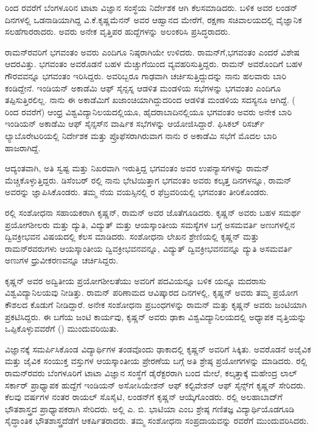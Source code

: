  ರಿಂದ  ರವರೆಗೆ ಬೆಂಗಳೂರಿನ ಟಾಟಾ ವಿಜ್ಞಾನ ಸಂಸ್ಥೆಯ ನಿರ್ದೇಶಕ ಆಗಿ ಕೆಲಸಮಾಡಿದರು. ಬಳಿಕ ಅವರ ಲಂಡನ್ ದಿನಗಳಲ್ಲಿ ಒಡನಾಡಿಯಾಗಿದ್ದ ವಿ.ಕೆ.ಕೃಷ್ಣಮೆನನ್ ಅವರ ಆಹ್ವಾನದ ಮೇರೆಗೆ, ರಕ್ಷಣಾ ಸಚಿವಾಲಯದಲ್ಲಿ ವೈಜ್ಞಾನಿಕ ಸಲಹೆಗಾರರಾದರು. ಅವರು ಅನೇಕ ವೃತ್ತಿಪರ ಹುದ್ದೆಗಳನ್ನು ಅಲಂಕರಿಸಿ ಪ್ರಸಿದ್ಧರಾದರು.

ರಾಮನ್‍ರವರಿಗೆ ಭಗವಂತಂ ಅವರು ಎಂದಿಗೂ ನಿಷ್ಠರಾಗಿಯೇ ಉಳಿದರು. ರಾಮನ್‍ಗೆ,\break ಭಗವಂತಂ ಎಂದರೆ ವಿಶೇಷ ಆದರವಿತ್ತು. ಭಗವಂತಂ ಅವರೊಡನೆ ಬಹಳ ಮೆಚ್ಚುಗೆಯಿಂದ ವ್ಯವಹರಿಸುತ್ತಿದ್ದರು. ರಾಮನ್ ಅವರೊಂದಿಗೆ ಬಹಳ ಗೌರವವನ್ನೂ ಭಗವಂತಂ ಇರಿಸಿದ್ದರು. ಅವರಿಬ್ಬರೂ ಗಾಢವಾಗಿ ಚರ್ಚಿಸುತ್ತಿದ್ದುದನ್ನು ನಾನು ಹಲವಾರು ಬಾರಿ ಕಂಡಿದ್ದೇನೆ. ಇಂಡಿಯನ್ ಅಕಾಡೆಮಿ ಆಫ್ ಸೈನ್ಸಸ್ನ ಆಡಳಿತ ಮಂಡಳಿಯ ಸಭೆಗಳನ್ನು ಭಗವಂತಂ ಎಂದಿಗೂ ತಪ್ಪಿಸುತ್ತಿರಲಿಲ್ಲ. ನಾನು ಈ ಅಕಾಡೆಮಿಗೆ ಖಜಾಂಚಿಯಾಗಿದ್ದುದರಿಂದ ಆಡಳಿತ ಮಂಡಳಿಯ ಸದಸ್ಯನೂ ಆಗಿದ್ದೆ. ( ರಿಂದ  ರವರೆಗೆ) ಆಂಧ್ರ ವಿಶ್ವವಿದ್ಯಾನಿಲಯದಲ್ಲಿಯೂ, ಹೈದರಾಬಾದಿನಲ್ಲಿಯೂ ಭಗವಂತಂ ಅವರು ಅನೇಕ ಬಾರಿ ಇಂಡಿಯನ್ ಅಕಾಡೆಮಿ ಆಫ್ ಸೈನ್ಸಸ್‍ನ ವಾರ್ಷಿಕ ಸಭೆಗಳನ್ನು ಆಯೋಜಿಸಿದ್ದಾರೆ. ಫಿಸಿಕಲ್ ರಿಸರ್ಚ್ ಲ್ಯಾಬೊರೇಟರಿಯಲ್ಲಿ ನಿರ್ದೇಶಕ ಮತ್ತು ಪ್ರೊಫೆಸರಾಗಿರುವಾಗ ನಾನು ರ ಅಕಾಡೆಮಿ ಸಭೆಗೆ ಮೊದಲ ಬಾರಿ ಹಾಜರಾಗಿದ್ದೆ.

ಆದ್ಯಂತವಾಗಿ, ಅತಿ ಸ್ವಷ್ಟ ಮತ್ತು ನಿಖರವಾಗಿ ಇರುತ್ತಿದ್ದ ಭಗವಂತಂ ಅವರ ಉಪನ್ಯಾಸಗಳನ್ನು ರಾಮನ್ ಮೆಚ್ಚಿಕೊಳ್ಳುತ್ತಿದ್ದರು. ಡಿಸೆಂಬರ್ ರಲ್ಲಿ ನಾನು ಭೇಟಿಯಿತ್ತಾಗ ಭಗವಂತಂ ಅವರು ಕಲ್ಕತ್ತ ದಿನಗಳನ್ನೂ, ರಾಮನ್ ಅವರನ್ನು ಜ್ಞಾಪಿಸಿಕೊಂಡರು. ತಮ್ಮ  ನೆಯ ವಯಸ್ಸಿನಲ್ಲಿ ರ ಫೆಬ್ರವರಿಯಲ್ಲಿ ಭಗವಂತಂ ತೀರಿಕೊಂಡರು.



ರಲ್ಲಿ ಸಂಶೋಧನಾ ಸಹಾಯಕರಾಗಿ ಕೃಷ್ಣನ್, ರಾಮನ್ ಅವರ ಜೊತೆಗೂಡಿದರು. ಕೃಷ್ಣನ್ ಅವರು ಬಹಳ ಸಮರ್ಥ ಪ್ರಯೋಗಶೀಲರು ಮತ್ತು ದ್ಯುತಿ, ವಿದ್ಯುತ್ ಮತ್ತು ಆಯಸ್ಕಾಂತೀಯ ಸಮಸ್ಯೆಗಳ ಬಗ್ಗೆ ಅಸಮವರ್ತಿ ಅಣುಗಳಲ್ಲಿನ ದ್ವಿವಕ್ರೀಭವನ ವಿಷಯದಲ್ಲಿ ಕೆಲಸ ಮಾಡಿದರು. ಸಂಶೋಧನಾ ಲೇಖನ ಶ್ರೇಣಿಯಲ್ಲಿ ಕೃಷ್ಣನ್ ಮತ್ತು ರಾಮನ್‍ರವರುಗಳು ಆಯಸ್ಕಾಂತೀಯ ದ್ವಿವಕ್ರೀಭವನವನ್ನೂ, ವಿದ್ಯುತ್ ದ್ವಿವಕ್ರೀಭವನವನ್ನೂ ದ್ಯುತಿ ಅಸಮವರ್ತಿ ಅಣುಗಳ ಧ್ರುವೀಕರಣವನ್ನೂ ಚರ್ಚಿಸಿದ್ದರು.

ಕೃಷ್ಣನ್ ಅವರ ಅದ್ವಿತೀಯ ಪ್ರಯೋಗಶೀಲತೆಯು ಅವರಿಗೆ  ಪದವಿಯನ್ನೂ ಬಳಿಕ  ಯನ್ನೂ ಮದರಾಸು ವಿಶ್ವವಿದ್ಯಾನಿಲಯವು ನೀಡಿತ್ತು. ರಾಮನ್ ಪರಿಣಾಮದ ಆವಿಷ್ಕಾರದ ದಿನಗಳಲ್ಲಿ, ಕೃಷ್ಣನ್ ಅವರು ತಮ್ಮ ಪ್ರಯೋಗ ಕೌಶಲದ ಕೊಡುಗೆ ನೀಡಿದ್ದಾರೆ. ಅನೇಕ ಸಂಶೋಧನಾ ಪ್ರಬಂಧಗಳನ್ನು ರಾಮನ್ ಮತ್ತು ಕೃಷ್ಣನ್ ಅವರು ಜಂಟಿಯಾಗಿ ಪ್ರಕಟಿಸಿದ್ದರು. ಈ ಬಗೆಯ ಜಂಟಿ ಕಾರ್ಯವು, ಕೃಷ್ಣನ್ ಅವರು ಢಾಕಾ ವಿಶ್ವವಿದ್ಯಾನಿಲಯದಲ್ಲಿ ಅಧ್ಯಾಪಕ ವೃತ್ತಿಯನ್ನು ಒಪ್ಪಿಕೊಳ್ಳುವವರೆಗೆ () ಮುಂದುವರಿಯಿತು.

ವಿಜ್ಞಾನಕ್ಕೆ ಸಮರ್ಪಿಸಿಕೊಂಡ ವಿದ್ಯಾರ್ಥಿಗಳ ತಂಡವೊಂದು ಢಾಕಾದಲ್ಲಿ ಕೃಷ್ಣನ್ ಅವರಿಗೆ ಸಿಕ್ಕಿತು. ಅವರೊಡನೆ ಅಜೈವಿಕ ಮತ್ತು ಜೈವಿಕ ಸಂಯುಕ್ತ ವಸ್ತುಗಳ ಆಯಸ್ಕಾಂತೀಯ ಪ್ರೇರಣೆಯ ಬಗ್ಗೆ ಅತಿ ಶ್ರೇಷ್ಠ ಪ್ರಯೋಗಗಳನ್ನು ಮಾಡಿದರು. ರಲ್ಲಿ ರಾಮನ್‍ರವರು ಬೆಂಗಳೂರಿಗೆ ಟಾಟಾ ವಿಜ್ಞಾನ ಸಂಸ್ಥೆಗೆ ಡೈರೆಕ್ಟರರಾಗಿ ಬಂದ ಮೇಲೆ, ಕಲ್ಕತ್ತಾಕ್ಕೆ ಮಹೇಂದ್ರ ಲಾಲ್ ಸರ್ಕಾರ್ ಪ್ರಾಧ್ಯಾಪಕ ಹುದ್ದೆಗೆ ಇಂಡಿಯನ್ ಅಸೋಸಿಯೇಶನ್ ಆಫ್ ಕಲ್ಟಿವೇಶನ್ ಆಫ್ ಸೈನ್ಸ್‌ಗೆ ಕೃಷ್ಣನ್ ಸೇರಿದರು. ಕೆಲವು ವರ್ಷಗಳ ನಂತರ ರಾಯಲ್ ಸೊಸೈಟಿ, ಲಂಡನ್‍ಗೆ ಕೃಷ್ಣನ್ ಆಯ್ಕೆಗೊಂಡರು. ರಲ್ಲಿ ಅಲಹಾಬಾದ್‍ಗೆ ಭೌತಶಾಸ್ತ್ರದ ಪ್ರಾಧ್ಯಾಪಕರಾಗಿ ಸೇರಿದರು. ಅಲ್ಲಿ ಎ. ಬಿ. ಭಾಟಿಯಾ ಎಂಬ ಶ್ರೇಷ್ಠ ಗಣಿತಜ್ಞ ವಿದ್ಯಾರ್ಥಿಯೊಡಗೂಡಿ ಸೈದ್ಧಾಂತಿಕ ಭೌತಶಾಸ್ತ್ರದೆಡೆಗೆ ಆಕರ್ಷಿತರಾದರು. ತಮ್ಮ ಸಂಶೋಧನಾ ಸಂಪ್ರದಾಯವನ್ನು ರವರೆಗೆ ಮುಂದುವರಿಸಿದರು.

